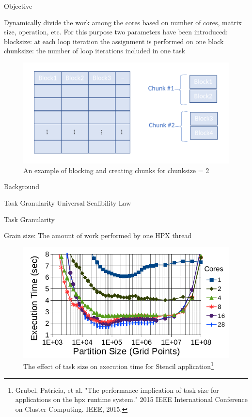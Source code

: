 \documentclass[10pt]{beamer}
\begin{document}
\begin{frame}{Objective}
	\begin{outline}
		Dynamically divide the work among the cores based on number of cores, matrix size, operation, etc.
		For this purpose two parameters have been introduced:
		\1block\textunderscore size: at each loop iteration the assignment is performed on one block
		\1chunk\textunderscore size: the number of loop iterations included in one task 
		\begin{figure}
			\centering
			\includegraphics[width=0.72\linewidth]{figures/chunks.png}
			\caption{An example of blocking and creating chunks for chunk\textunderscore size = 2}	
		\end{figure}	
	\end{outline}
\end{frame}


\begin{frame}{Background}
	\begin{outline}
		\1 Task Granularity
		\1 Universal Scalibility Law
	\end{outline}
\end{frame}


\begin{frame}{Task Granularity}
	\begin{outline}
		Grain size: The amount of work performed by one HPX thread
		\begin{figure}
			\centering
			\includegraphics[width=0.72\linewidth]{figures/task_granularity.png}
			\caption{The effect of task size on execution time for Stencil application\footnote{Grubel, Patricia, et al. "The performance implication of task size for applications on the hpx runtime system." 2015 IEEE International Conference on Cluster Computing. IEEE, 2015.}}	
	
		\end{figure}
		
	\end{outline}
\end{frame}
\end{document}
